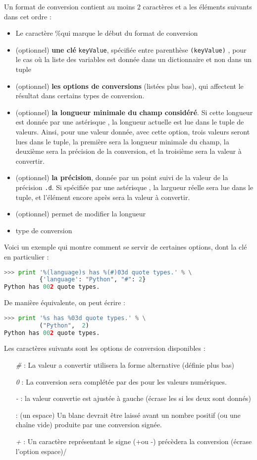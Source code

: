 \documentclass[a4paper,twoside]{article}
\begin{document}
Un format de conversion contient au moins 2 caractères et a les éléments suivants dans cet ordre :
\begin{itemize}
\item Le caractère \og\%\fg qui marque le début du format de conversion
\item (optionnel) \textbf{une clé} \texttt{keyValue}, spécifiée entre parenthèse \texttt{(keyValue)} , pour le cas où la liste des variables est donnée dans un dictionnaire et non dans un tuple
\item (optionnel) \textbf{les options de conversions} (listées plus bas), qui affectent le résultat dans certains types de conversion.
\item (optionnel) \textbf{la longueur minimale du champ considéré}. Si cette longueur est donnée par une astérisque \og *\fg, la longueur actuelle est lue dans le tuple de valeurs. Ainsi, pour une valeur donnée, avec cette option, trois valeurs seront lues dans le tuple, la première sera la longueur minimale du champ, la deuxième sera la précision de la conversion, et la troisième sera la valeur à convertir.
\item (optionnel) \textbf{la précision}, donnée par un point suivi de la valeur de la précision \texttt{.d}. Si spécifiée par une astérisque \og * \fg, la largueur réelle sera lue dans le tuple, et l'élément encore après sera la valeur à convertir.
\item (optionnel) permet de modifier la longueur
\item type de conversion
\end{itemize}

Voici un exemple qui montre comment se servir de certaines options, dont la clé en particulier : 
\begin{lstlisting}[language=python]
>>> print '%(language)s has %(#)03d quote types.' % \
          {'language': "Python", "#": 2}
Python has 002 quote types.
\end{lstlisting}

De manière équivalente, on peut écrire :
\begin{lstlisting}[language=python]
>>> print '%s has %03d quote types.' % \
          ("Python",  2)
Python has 002 quote types.
\end{lstlisting}

Les caractères suivants sont les options de conversion disponibles :
\begin{itemize}
\item[\emph{\#}]: La valeur a convertir utilisera la forme alternative (définie plus bas)
\item[\emph{0}]: La conversion sera complétée par des \fg pour les valeurs numériques.
\item[\emph{-}]: la valeur convertie est ajustée à gauche (écrase les \fg si les deux sont donnés)
\item[\emph{ }]: (un espace) Un blanc devrait être laissé avant un nombre positif (ou une chaîne vide) produite par une conversion signée.
\item[\emph{+}]: Un caractère représentant le signe (\og+\fg ou \og-\fg) précèdera la conversion (écrase l'option \og espace\fg)/
\end{itemize}
\end{document}
